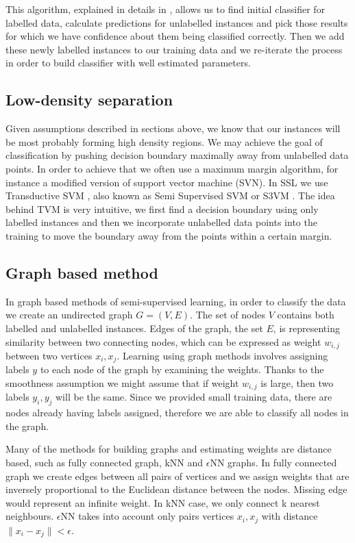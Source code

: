 \documentclass[12pt, a4paper, pdflatex]{report}
\begin{document}
This algorithm, explained in details in \cite{chapelle06}, allows us to find initial classifier for labelled data, calculate predictions for unlabelled instances and pick those results for which we have confidence about them being classified correctly. Then we add these newly labelled instances to our training data and we re-iterate the process in order to build classifier with well estimated parameters.

\subsection{Low-density separation}

Given assumptions described in sections above, we know that our instances will be most probably forming high density regions. We may achieve the goal of classification by pushing decision boundary maximally away from unlabelled data points.
In order to achieve that we often use a maximum margin algorithm, for instance a modified version of support vector machine (SVN)\cite{chapelle06,Zhu06semi}. In SSL we use Transductive SVM \cite{chapelle06}, also known as Semi Supervised SVM or S3VM \cite{Zhu06semi}.
The idea behind TVM is very intuitive, we first find a decision boundary using only labelled instances and then we incorporate unlabelled data points into the training to move the boundary away from the points within a certain margin.


\subsection{Graph based method}

In graph based methods of semi-supervised learning, in order to classify the data we create an undirected graph $ G = (V, E) $. The set of nodes $ V $ contains both labelled and unlabelled instances. Edges of the graph, the set $ E $, is representing similarity between two connecting nodes, which can be expressed as weight $ w_{i,j} $ between two vertices $x_{i}, x_{j} $. Learning using graph methods involves assigning labels $ y $ to each node of the graph by examining the weights. Thanks to the smoothness assumption we might assume that if weight $ w_{i,j} $ is large, then two labels $ y_i, y_j $ will be the same. Since we provided small training data, there are nodes already having labels assigned, therefore we are able to classify all nodes in the graph\cite{Zhu06semi}.

Many of the methods for building graphs and estimating weights are distance based, such as fully connected graph, kNN and $\epsilon$NN graphs\cite{Zhu06semi}. In fully connected graph we create edges between all pairs of vertices and we assign weights that are inversely proportional to the Euclidean distance between the nodes. Missing edge would represent an infinite weight\cite{chapelle06}. In kNN case, we only connect k nearest neighbours. $\epsilon$NN takes into account only pairs vertices $ x_i, x_j $ with distance $ \| x_i - x_j \| < \epsilon $.
\end{document}
